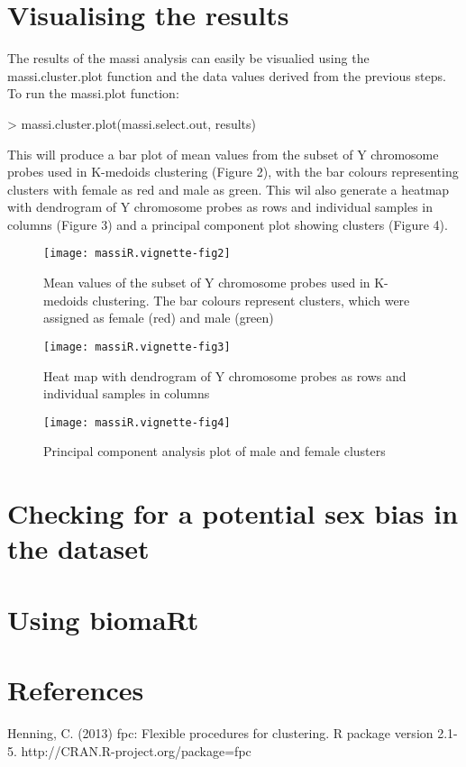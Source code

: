 \documentclass{article}
\begin{document}
\section{Visualising the results}

The results of the massi analysis can easily be visualied using the massi.cluster.plot function and the data values derived from the previous steps. 
To run the massi.plot function:
\begin{Schunk}
\begin{Sinput}
> massi.cluster.plot(massi.select.out, results)
\end{Sinput}
\end{Schunk}
This will produce a bar plot of mean values from the subset of Y chromosome probes used in K-medoids clustering (Figure 2), with the bar colours representing clusters with female as red and male as green. This wil also generate a heatmap with dendrogram of Y chromosome probes as rows and individual samples in columns (Figure 3) and a principal component plot showing clusters (Figure 4). 
\clearpage

\begin{figure}
\begin{center}
\texttt{[image: massiR.vignette-fig2]}
\end{center}
\caption{Mean values of the subset of Y chromosome probes used in K-medoids clustering. The bar colours represent clusters, which were assigned as female (red) and male (green)}
\label{fig:fig2}
\end{figure}

\begin{figure}
\begin{center}
\texttt{[image: massiR.vignette-fig3]}
\end{center}
\caption{Heat map with dendrogram of Y chromosome probes as rows and individual samples in columns}
\label{fig:fig3}
\end{figure}

\begin{figure}
\begin{center}
\texttt{[image: massiR.vignette-fig4]}
\end{center}
\caption{Principal component analysis plot of male and female clusters}
\label{fig:fig4}
\end{figure}

\clearpage

\section{Checking for a potential sex bias in the dataset}

\section{Using biomaRt}



\clearpage

\section{References}
Henning, C. (2013) fpc: Flexible procedures for clustering. R package version 2.1-5. http://CRAN.R-project.org/package=fpc
\end{document}
